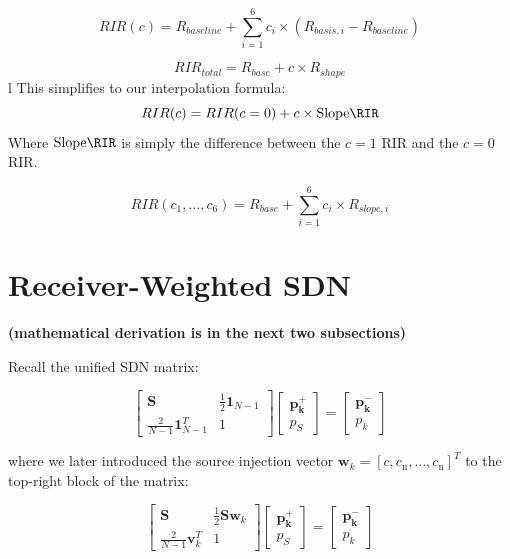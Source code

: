 \documentclass[conference]{IEEEtran}
\begin{document}
$$ RIR(c) = R_{baseline} + \sum_{i=1}^{6} c_i \times (R_{basis, i} - R_{baseline}) $$

$$ RIR_{total} = R_{base} + c \times R_{shape} $$
l
This simplifies to our interpolation formula:
$$ RIR(c) = RIR(c=0) + c \times \text{Slope\RIR} $$
Where $\text{Slope\RIR}$ is simply the difference between the $c=1$ RIR and the $c=0$ RIR.


$$ RIR(c_1, \dots, c_6) = R_{base} + \sum_{i=1}^{6} c_i \times R_{slope, i} $$

\newpage
\section{Receiver-Weighted SDN}
\label{sec:pickup}

\textbf{(mathematical derivation is in the next two subsections)}

Recall the unified SDN matrix:

\begin{equation}
\label{eq:augmented_matrix}
\begin{bmatrix}
    \mathbf{S} & \frac{1}{2}\mathbf{1}_{N-1} \\
    \frac{2}{N-1}\mathbf{1}_{N-1}^T & 1
\end{bmatrix}
\begin{bmatrix}
\mathbf{p_k^+} \\
p_{S}
\end{bmatrix}
=
\begin{bmatrix}
\mathbf{p_k^-} \\
p_k
\end{bmatrix}
\end{equation}

where we later introduced the source injection vector $\mathbf{w}_k= [c, c_{\text{n}}, \ldots ,c_{\text{n}}]^T$ to the top-right block of the matrix:

\begin{equation}
\label{eq:tunable_sdn_matrix}
\begin{bmatrix} 
\mathbf{S} & \frac{1}{2}\mathbf{S}\mathbf{w}_k \\ 
\frac{2}{N-1}\mathbf{v}_k^T & 1 
\end{bmatrix} 
\begin{bmatrix} \mathbf{p_k^+} \\ p_S \end{bmatrix}
= \begin{bmatrix} \mathbf{p_k^-} \\ p_k \end{bmatrix}
\end{equation}
\end{document}
